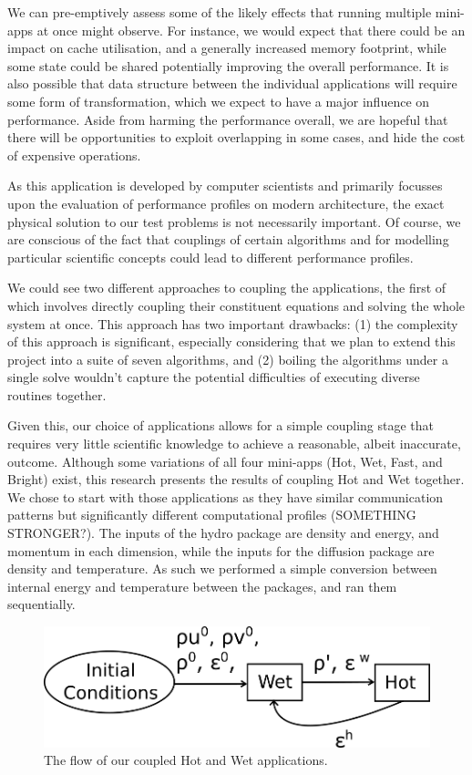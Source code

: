 \documentclass[runningheads,a4paper]{llncs}
\begin{document}
We can pre-emptively assess some of the likely effects that running multiple mini-apps at once might observe. For instance, we would expect that there could be an impact on cache utilisation, and a generally increased memory footprint, while some state could be shared potentially improving the overall performance. It is also possible that data structure between the individual applications will require some form of transformation, which we expect to have a major influence on performance. Aside from harming the performance overall, we are hopeful that there will be opportunities to exploit overlapping in some cases, and hide the cost of expensive operations.

As this application is developed by computer scientists and primarily focusses upon the evaluation of performance profiles on modern architecture, the exact physical solution to our test problems is not necessarily important. Of course, we are conscious of the fact that couplings of certain algorithms and for modelling particular scientific concepts could lead to different performance profiles.

We could see two different approaches to coupling the applications, the first of which involves directly coupling their constituent equations and solving the whole system at once. This approach has two important drawbacks: (1) the complexity of this approach is significant, especially considering that we plan to extend this project into a suite of seven algorithms, and (2) boiling the algorithms under a single solve wouldn't capture the potential difficulties of executing diverse routines together.

Given this, our choice of applications allows for a simple coupling stage that requires very little scientific knowledge to achieve a reasonable, albeit inaccurate, outcome. Although some variations of all four mini-apps (Hot, Wet, Fast, and Bright) exist, this research presents the results of coupling Hot and Wet together. We chose to start with those applications as they have similar communication patterns but significantly different computational profiles (SOMETHING STRONGER?). The inputs of the hydro package are density and energy, and momentum in each dimension, while the inputs for the diffusion package are density and temperature. As such we performed a simple conversion between internal energy and temperature between the packages, and ran them sequentially.

\begin{figure}
\centering
\includegraphics[width=0.8\linewidth]{hot-wet-flow}
\caption{The flow of our coupled Hot and Wet applications.}
\label{fig:hot-wet-flow}
\end{figure}
\end{document}
